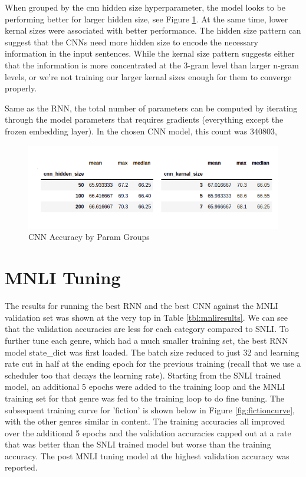 \documentclass[a4paper,10pt]{article}
\begin{document}
\par 
\justify
When grouped by the cnn hidden size hyperparameter, the model looks to be performing better for larger hidden size, see Figure \ref{fig:cnnparams}. At the same time, lower kernal sizes were associated with better performance. The hidden size pattern can suggest that the CNNs need more hidden size to encode the necessary information in the input sentences. While the kernal size pattern suggests either that the information is more concentrated at the 3-gram level than larger n-gram levels, or we're not training our larger kernal sizes enough for them to converge properly.

\par 
\justify
Same as the RNN, the total number of parameters can be computed by iterating through the model parameters that requires gradients (everything except the frozen embedding layer). In the chosen CNN model, this count was 340803, 


\begin{figure}[h]
    \centering
    \includegraphics[scale=0.7]{cnn_params}
    \caption{CNN Accuracy by Param Groups}
    \label{fig:cnnparams}
\end{figure}

\section{MNLI Tuning}
The results for running the best RNN and the best CNN against the MNLI validation set was shown at the very top in Table \ref{tbl:mnliresults}. We can see that the validation accuracies are less for each category compared to SNLI. To further tune each genre, which had a much smaller training set, the best RNN model state\_dict was first loaded. The batch size reduced to just 32 and learning rate cut in half at the ending epoch for the previous training (recall that we use a scheduler too that decays the learning rate). Starting from the SNLI trained model, an additional 5 epochs were added to the training loop and the MNLI training set for that genre was fed to the training loop to do fine tuning. The subsequent training curve for 'fiction' is shown below in Figure \ref{fig:fictioncurve}, with the other genres similar in content. The training accuracies all improved over the additional 5 epochs and the validation accuracies capped out at a rate that was better than the SNLI trained model but worse than the training accuracy. The post MNLI tuning model at the highest validation accuracy was reported.
\end{document}

